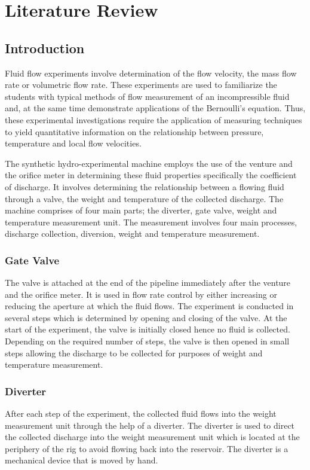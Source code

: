 \section{Literature Review}
\subsection{Introduction}
Fluid flow experiments involve determination of the flow velocity, the mass flow rate or volumetric flow rate. These experiments are used to familiarize the students with typical methods of flow measurement of an incompressible fluid and, at the same time demonstrate applications of the Bernoulli's equation. Thus, these experimental investigations require the application of measuring techniques to yield quantitative information on the relationship between pressure, temperature and local flow velocities.
\par
The synthetic hydro-experimental machine employs the use of the venture and the orifice meter in determining these fluid properties specifically the coefficient of discharge. It involves determining the relationship between a flowing fluid through a valve, the weight and temperature of the collected discharge. The machine comprises of four main parts; the diverter, gate valve, weight and temperature measurement unit. The measurement involves four main processes, discharge collection, diversion, weight and temperature measurement. 
\subsubsection{Gate Valve }
\par
The valve is attached at the end of the pipeline immediately after the venture and the orifice meter. It is used in flow rate control by either increasing or reducing the aperture at which the fluid flows. The experiment is conducted in several steps which is determined by opening and closing of the valve. At the start of the experiment, the valve is initially closed hence no fluid is collected. Depending on the required number of steps, the valve is then opened in small steps allowing the discharge to be collected for purposes of weight and temperature measurement.
\subsubsection{Diverter }
\par
After each step of the experiment, the collected fluid flows into the weight measurement unit through the help of a diverter. The diverter is used to direct the collected discharge into the weight measurement unit which is located at the periphery of the rig to avoid flowing back into the reservoir. The diverter is a mechanical device that is moved by hand.
